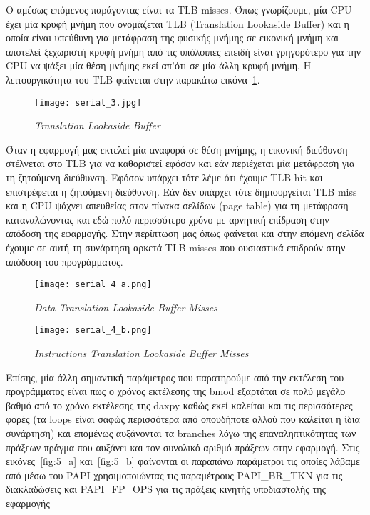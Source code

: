 \documentclass[greek,booktabs,8pt,flagBlueCMYK]{report}
\begin{document}
\clearpage

Ο αμέσως επόμενος παράγοντας είναι τα TLB misses.  Όπως γνωρίζουμε, μία CPU έχει μία κρυφή μνήμη που ονομάζεται TLB (Translation Lookaside Buffer) και η οποία είναι υπεύθυνη για μετάφραση της φυσικής μνήμης σε εικονική μνήμη και αποτελεί ξεχωριστή κρυφή μνήμη από τις υπόλοιπες επειδή είναι γρηγορότερο για την CPU να ψάξει μία θέση μνήμης εκεί απ’ότι σε μία άλλη κρυφή μνήμη. Η λειτουργικότητα του TLB φαίνεται στην παρακάτω 
εικόνα~\ref{fig:serial_3}. 

\begin{figure}[ht]
\centering
\texttt{[image: serial\_3.jpg]}
\caption{\textit{Translation Lookaside Buffer}}
\label{fig:serial_3}
\end{figure}

Όταν η εφαρμογή μας εκτελεί μία αναφορά σε θέση μνήμης, η εικονική διεύθυνση στέλνεται στο TLB για να καθοριστεί εφόσον και εάν περιέχεται μία μετάφραση για τη ζητούμενη διεύθυνση. Εφόσον υπάρχει τότε λέμε ότι έχουμε TLB hit και επιστρέφεται η ζητούμενη διεύθυνση. Εάν δεν υπάρχει τότε δημιουργείται TLB miss και η CPU ψάχνει απευθείας στον πίνακα σελίδων (page table) για τη μετάφραση καταναλώνοντας και εδώ πολύ περισσότερο χρόνο με αρνητική επίδραση στην απόδοση της εφαρμογής.  
\FloatBarrier 
Στην περίπτωση μας όπως φαίνεται και στην επόμενη σελίδα έχουμε σε αυτή τη συνάρτηση αρκετά TLB misses που ουσιαστικά επιδρούν στην απόδοση του προγράμματος. 

\begin{figure}[ht]
\centering
\texttt{[image: serial\_4\_a.png]}
\caption{\textit{Data Translation Lookaside Buffer Misses }}
\label{fig:serial_4_a}
\end{figure}

\begin{figure}[ht]
\centering
\texttt{[image: serial\_4\_b.png]}
\caption{\textit{Instructions Translation Lookaside Buffer Misses}}
\label{fig:serial_4_b}
\end{figure}

\clearpage
Επίσης, μία άλλη σημαντική παράμετρος που παρατηρούμε από την εκτέλεση του προγράμματος είναι πως ο χρόνος εκτέλεσης της bmod εξαρτάται σε πολύ μεγάλο βαθμό από το χρόνο εκτέλεσης της daxpy καθώς εκεί καλείται και τις περισσότερες φορές (τα loops είναι σαφώς περισσότερα από οπουδήποτε αλλού που καλείται η ίδια συνάρτηση) και επομένως αυξάνονται τα branches λόγω της επαναληπτικότητας των πράξεων πράγμα που αυξάνει και τον συνολικό αριθμό πράξεων στην εφαρμογή. Στις εικόνες~\ref{fig:5_a} και~\ref{fig:5_b} φαίνονται οι παραπάνω παράμετροι τις οποίες λάβαμε από μέσω του PAPI χρησιμοποιώντας τις παραμέτρους PAPI\_BR\_TKN για τις διακλαδώσεις και  PAPI\_FP\_OPS για τις πράξεις κινητής υποδιαστολής της εφαρμογής
\end{document}
